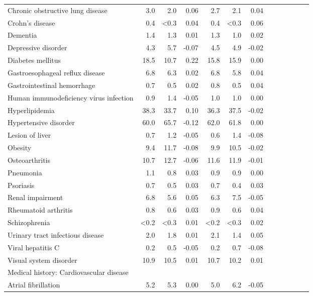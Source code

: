 \documentclass[11pt,]{article}
\begin{document}
\begin{longtable}{lrrrrrrrrrrrr}
      Chronic obstructive lung disease &  3.0 &  2.0 &  0.06 &  2.7 &  2.1 &  0.04 \\ 
      Crohn's disease &  0.4 & <0.3 &  0.04 &  0.4 & <0.3 &  0.06 \\ 
      Dementia &  1.4 &  1.3 &  0.01 &  1.3 &  1.0 &  0.02 \\ 
      Depressive disorder &  4.3 &  5.7 & -0.07 &  4.5 &  4.9 & -0.02 \\ 
      Diabetes mellitus & 18.5 & 10.7 &  0.22 & 15.8 & 15.9 &  0.00 \\ 
      Gastroesophageal reflux disease &  6.8 &  6.3 &  0.02 &  6.8 &  5.8 &  0.04 \\ 
      Gastrointestinal hemorrhage &  0.7 &  0.5 &  0.02 &  0.8 &  0.5 &  0.04 \\ 
      Human immunodeficiency virus infection &  0.9 &  1.4 & -0.05 &  1.0 &  1.0 &  0.00 \\ 
      Hyperlipidemia & 38.3 & 33.7 &  0.10 & 36.3 & 37.5 & -0.02 \\ 
      Hypertensive disorder & 60.0 & 65.7 & -0.12 & 62.0 & 61.8 &  0.00 \\ 
      Lesion of liver &  0.7 &  1.2 & -0.05 &  0.6 &  1.4 & -0.08 \\ 
      Obesity &  9.4 & 11.7 & -0.08 &  9.9 & 10.5 & -0.02 \\ 
      Osteoarthritis & 10.7 & 12.7 & -0.06 & 11.6 & 11.9 & -0.01 \\ 
      Pneumonia &  1.1 &  0.8 &  0.03 &  0.9 &  0.9 &  0.00 \\ 
      Psoriasis &  0.7 &  0.5 &  0.03 &  0.7 &  0.4 &  0.03 \\ 
      Renal impairment &  6.8 &  5.6 &  0.05 &  6.3 &  7.5 & -0.05 \\ 
      Rheumatoid arthritis &  0.8 &  0.6 &  0.03 &  0.9 &  0.6 &  0.04 \\ 
      Schizophrenia & <0.2 & <0.3 &  0.01 & <0.2 & <0.3 &  0.02 \\ 
      Urinary tract infectious disease &  2.0 &  1.8 &  0.01 &  2.1 &  1.4 &  0.05 \\ 
      Viral hepatitis C &  0.2 &  0.5 & -0.05 &  0.2 &  0.7 & -0.08 \\ 
      Visual system disorder & 10.9 & 10.5 &  0.01 & 10.7 & 10.2 &  0.01 \\ 
  Medical history: Cardiovascular disease &    &    &     &    &    &     \\ 
      Atrial fibrillation &  5.2 &  5.3 &  0.00 &  5.0 &  6.2 & -0.05 \\ 

\end{longtable}
\end{document}
